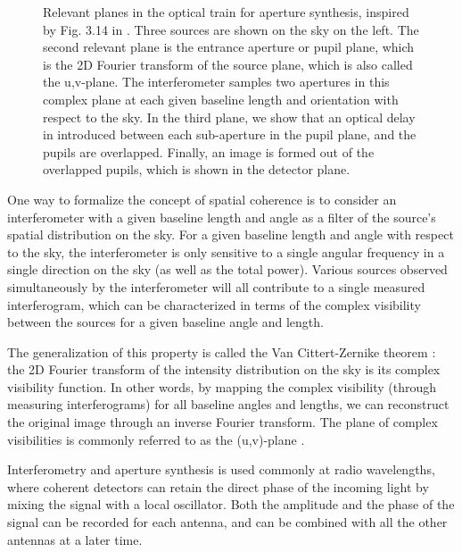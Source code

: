 \begin{figure}[!h]
	\centering
	
	\caption[Aperture synthesis]{Relevant planes in the optical train for aperture synthesis, inspired by Fig. 3.14 in \citet{Glindemann:2011hk}. Three sources are shown on the sky on the left. The second relevant plane is the entrance aperture or pupil plane, which is the 2D Fourier transform of the source plane, which is also called the u,v-plane. The interferometer samples two apertures in this complex plane at each given baseline length and orientation with respect to the sky. In the third plane, we show that an optical delay in introduced between each sub-aperture in the pupil plane, and the pupils are overlapped. Finally, an image is formed out of the overlapped pupils, which is shown in the detector plane.}
	\label{fig:aperturesynthesis}
    \end{figure}



One way to formalize the concept of spatial coherence is to consider an interferometer with a given baseline length and angle as a filter of the source's spatial distribution on the sky. For a given baseline length and angle with respect to the sky, the interferometer is only sensitive to a single angular frequency in a single direction on the sky (as well as the total power). Various sources observed simultaneously by the interferometer will all contribute to a single measured interferogram, which can be characterized in terms of the complex visibility between the sources for a given baseline angle and length. 

The generalization of this property is called the Van Cittert-Zernike theorem \citep{Zernike:1938kq}: the 2D Fourier transform of the intensity distribution on the sky is its complex visibility function. In other words, by mapping the complex visibility (through measuring interferograms) for all baseline angles and lengths, we can reconstruct the original image through an inverse Fourier transform. The plane of complex visibilities is commonly referred to as the (u,v)-plane \citep{Thompson:2008ww}.

Interferometry and aperture synthesis is used commonly at radio wavelengths, where coherent detectors can retain the direct phase of the incoming light by mixing the signal with a local oscillator. Both the amplitude and the phase of the signal can be recorded for each antenna, and can be combined with all the other antennas at a later time.

